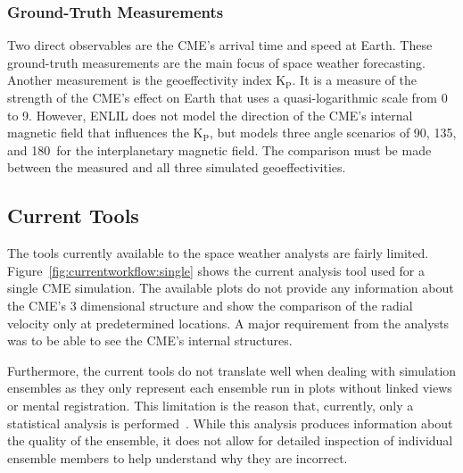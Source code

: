 \documentclass[journal]{vgtc}                %
\newcommand{\kpIndex}{$\textrm{K}_\textrm{P}$}
\begin{document}
\subsubsection{Ground-Truth Measurements} \label{sec:insitu}
Two direct observables are the CME's arrival time and speed at Earth. These ground-truth measurements are the main focus of space weather forecasting. Another measurement is the geoeffectivity index \kpIndex. It is a measure of the strength of the CME's effect on Earth that uses a quasi-logarithmic scale from 0 to 9. However, ENLIL does not model the direction of the CME's internal magnetic field that influences the \kpIndex , but models three angle scenarios of 90\degree , 135\degree , and 180\degree\ for the interplanetary magnetic field. The comparison must be made between the measured and all three simulated geoeffectivities.

\subsection{Current Tools} \label{sec:currentworkflow}
The tools currently available to the space weather analysts are fairly limited. Figure~\ref{fig:currentworkflow:single} shows the current analysis tool used for a single CME simulation. The available plots do not provide any information about the CME's 3 dimensional structure and show the comparison of the radial velocity only at predetermined locations. A major requirement from the analysts was to be able to see the CME's internal structures.

Furthermore, the current tools do not translate well when dealing with simulation ensembles as they only represent each ensemble run in plots without linked views or mental registration. This limitation is the reason that, currently, only a statistical analysis is performed~\cite{mays2015ensemble}. While this analysis produces information about the quality of the ensemble, it does not allow for detailed inspection of individual ensemble members to help understand why they are incorrect.
\end{document}
